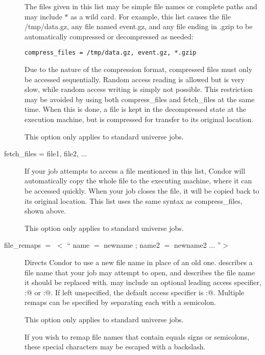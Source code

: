 \begin{description}
The files given in this list may be simple file names or complete paths and may
include $*$ as a wild card.  For example, this list causes the file /tmp/data.gz,
any file named event.gz, and any file ending in .gzip to be automatically
compressed or decompressed as needed:

\begin{verbatim}
compress_files = /tmp/data.gz, event.gz, *.gzip
\end{verbatim}
Due to the nature of the compression format, compressed files must only
be accessed sequentially.  Random access reading is allowed but is very slow,
while random access writing is simply not possible.  This restriction may be
avoided by using both compress\_files and fetch\_files at the same time.  When
this is done, a file is kept in the decompressed state at the execution
machine, but is compressed for transfer to its original location.

This option only applies to standard universe jobs.


\item[fetch\_files = file1, file2, ...]
If your job attempts to access a file mentioned in this list,
Condor will automatically copy the whole file to the executing machine,
where it can be accessed quickly.  When your job closes the file,
it will be copied back to its original location.
This list uses the same syntax as compress\_files, shown above.

This option only applies to standard universe jobs.


\item[file\_remaps $=$ $<$ `` name $=$ newname ; name2 $=$ newname2 ... ''$>$ ]

Directs Condor to use a new file name in place of an old one.  
describes a file name that your job may attempt to open, and 
describes the file name it should be replaced with.
 may include an optional leading
access specifier, \verb@local:@ or \verb@remote:@.  If left unspecified,
the default access specifier is \verb@remote:@.  Multiple remaps can be
specified by separating each with a semicolon.

This option only applies to standard universe jobs.

If you wish to remap file names that contain equals signs or semicolons,
these special characters may be escaped with a backslash.


\end{description}
